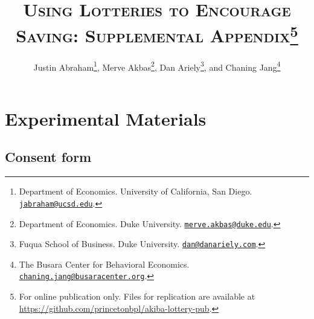 \documentclass[11pt]{article}
\begin{document}
\title{\textsc{Using Lotteries to Encourage Saving: Supplemental Appendix}\protect\footnote{For online publication only. Files for replication are available at \url{https://github.com/princetonbpl/akiba-lottery-pub}.}}

\author{Justin Abraham\thanks{Department of Economics. University of California, San Diego. \protect\href{mailto:jabraham@ucsd.edu}{\nolinkurl{jabraham@ucsd.edu}}.}, Merve Akbas\thanks{Department of Economics. Duke University. \protect\href{mailto:merve.akbas@duke.edu}{\nolinkurl{merve.akbas@duke.edu}}.}, Dan Ariely\thanks{Fuqua School of Business. Duke University. \protect\href{mailto:dan@danariely.com}{\nolinkurl{dan@danariely.com}}.}, and Chaning Jang\thanks{The Busara Center for Behavioral Economics. \protect\href{mailto:chaning.jang@busaracenter.org}{\nolinkurl{chaning.jang@busaracenter.org}}.}} %

\maketitle

\newpage

\tableofcontents

\newpage

\appendix

\section{Experimental Materials}

    \subsection{Consent form}
\end{document}
